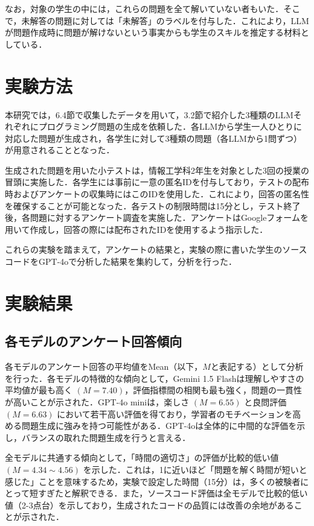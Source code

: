 \documentclass[11pt]{jreport}
\begin{document}
なお，対象の学生の中には，これらの問題を全て解いていない者もいた．そこで，未解答の問題に対しては「未解答」のラベルを付与した．これにより，LLMが問題作成時に問題が解けないという事実からも学生のスキルを推定する材料としている．

\section{実験方法}
本研究では，6.4節で収集したデータを用いて，3.2節で紹介した3種類のLLMそれぞれにプログラミング問題の生成を依頼した．各LLMから学生一人ひとりに対応した問題が生成され，各学生に対して3種類の問題（各LLMから1問ずつ）が用意されることとなった．

生成された問題を用いた小テストは，情報工学科2年生を対象とした3回の授業の冒頭に実施した．各学生には事前に一意の匿名IDを付与しており，テストの配布時およびアンケートの収集時にはこのIDを使用した．これにより，回答の匿名性を確保することが可能となった．各テストの制限時間は15分とし，テスト終了後，各問題に対するアンケート調査を実施した．アンケートはGoogleフォームを用いて作成し，回答の際には配布されたIDを使用するよう指示した．

これらの実験を踏まえて，アンケートの結果と，実験の際に書いた学生のソースコードをGPT-4oで分析した結果を集約して，分析を行った．
\section{実験結果}

\subsection{各モデルのアンケート回答傾向}
各モデルのアンケート回答の平均値をMean（以下，$M$と表記する）として分析を行った．各モデルの特徴的な傾向として，Gemini 1.5 Flashは理解しやすさの平均値が最も高く $(M=7.40)$，評価指標間の相関も最も強く，問題の一貫性が高いことが示された．GPT-4o miniは，楽しさ $(M=6.55)$ と良問評価 $(M=6.63)$ において若干高い評価を得ており，学習者のモチベーションを高める問題生成に強みを持つ可能性がある．GPT-4oは全体的に中間的な評価を示し，バランスの取れた問題生成を行うと言える．

全モデルに共通する傾向として，「時間の適切さ」の評価が比較的低い値 $(M=4.34\sim4.56)$ を示した．これは，1に近いほど「問題を解く時間が短いと感じた」ことを意味するため，実験で設定した時間（15分）は，多くの被験者にとって短すぎたと解釈できる．また，ソースコード評価は全モデルで比較的低い値（2-3点台）を示しており，生成されたコードの品質には改善の余地があることが示された．
\end{document}
